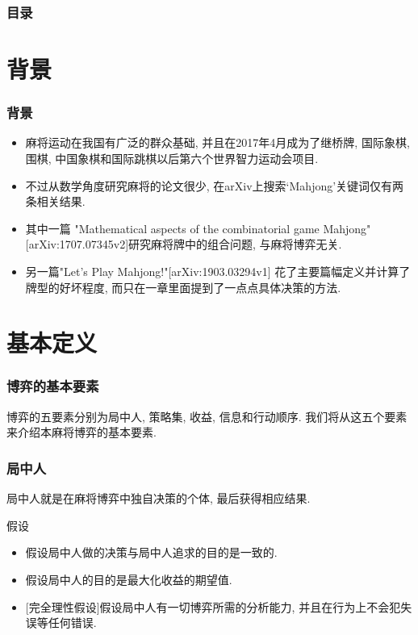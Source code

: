 \documentclass[xcolor=dvipsnames]{ctexbeamer}
\title{\TITLE}
\author{\AUTHOR}
\date{\today}
\institute{\INSTITUTE}
\begin{document}

    \begin{frame}
        \titlepage
	\end{frame}
	
	
	\begin{frame}
		\frametitle{目录}
		\tableofcontents
	\end{frame}

	
	\section{背景}

	\begin{frame}
		\frametitle{背景}
		\begin{itemize}
			\item 麻将运动在我国有广泛的群众基础, 并且在2017年4月成为了继桥牌,
				国际象棋, 围棋, 中国象棋和国际跳棋以后第六个世界智力运动会项目.
			\item 不过从数学角度研究麻将的论文很少,
				在arXiv上搜索`Mahjong'关键词仅有两条相关结果.
			\item 其中一篇
				"Mathematical aspects of the combinatorial game Mahjong"
				[arXiv:1707.07345v2]研究麻将牌中的组合问题,
				与麻将博弈无关.
			\item 另一篇"Let's Play Mahjong!"[arXiv:1903.03294v1]
				花了主要篇幅定义并计算了牌型的好坏程度,
				而只在一章里面提到了一点点具体决策的方法.
		\end{itemize}
	\end{frame}

	\section{基本定义}

	\begin{frame}
		\frametitle{博弈的基本要素}
		博弈的五要素分别为局中人, 策略集, 收益, 信息和行动顺序.
		我们将从这五个要素来介绍本麻将博弈的基本要素.
	\end{frame}

	\begin{frame}
		\frametitle{局中人}
		\begin{definition}[局中人]
			局中人就是在麻将博弈中独自决策的个体, 最后获得相应结果.
		\end{definition}
		
		\begin{block}{假设}
			\begin{itemize}
				\item 假设局中人做的决策与局中人追求的目的是一致的.
				\item 假设局中人的目的是最大化收益的期望值.
				\item {[\alert{完全理性假设}]}假设局中人有一切博弈所需的分析能力,
					并且在行为上不会犯失误等任何错误.
			\end{itemize}
		\end{block}
	\end{frame}
\end{document}
